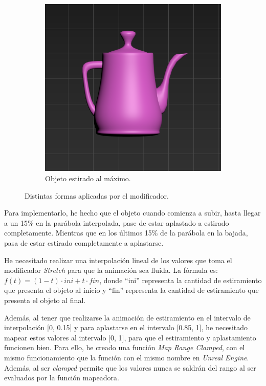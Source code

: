 \begin{figure}[H]
\begin{subfigure}[t]{0.45\textwidth}
	    \includegraphics[width=\textwidth]{imagenes/estirado.png}
        \caption{Objeto estirado al máximo.}
    \end{subfigure}    
    \caption{Distintas formas aplicadas por el modificador.}
\end{figure}

Para implementarlo, he hecho que el objeto cuando comienza a subir, hasta llegar a un 15\% en la parábola interpolada, pase de estar aplastado a estirado completamente. Mientras que en los últimos 15\% de la parábola en la bajada, pasa de estar estirado completamente a aplastarse.

\bigskip

He necesitado realizar una interpolación lineal de los valores que toma el modificador \textit{Stretch} para que la animación sea fluida. La fórmula es: $f(t)=(1-t) \cdot ini + t \cdot fin$, donde ``ini'' representa la cantidad de estiramiento que presenta el objeto al inicio y ``fin'' representa la cantidad de estiramiento que presenta el objeto al final.

\bigskip

Además, al tener que realizarse la animación de estiramiento en el intervalo de interpolación [0, 0.15] y para aplastarse en el intervalo [0.85, 1], he necesitado mapear estos valores al intervalo [0, 1], para que el estiramiento y aplastamiento funcionen bien. Para ello, he creado una función \textit{Map Range Clamped}, con el mismo funcionamiento que la función con el mismo nombre en \textit{Unreal Engine}. Además, al ser \textit{clamped} permite que los valores nunca se saldrán del rango al ser evaluados por la función mapeadora.